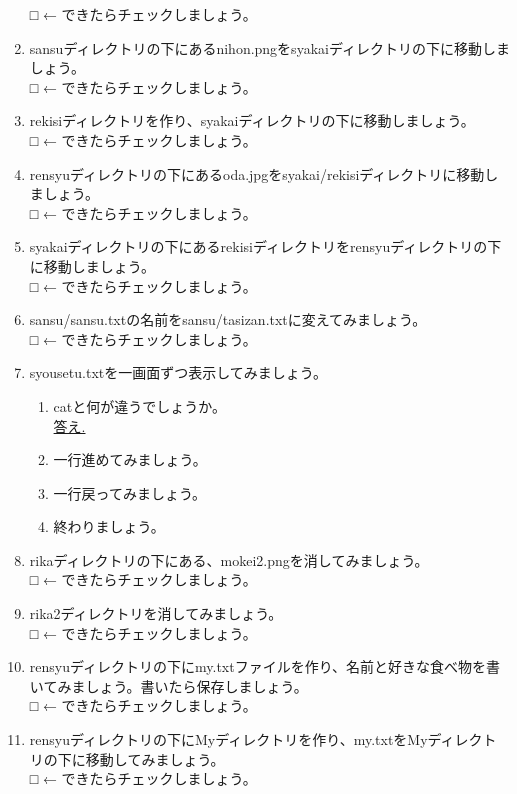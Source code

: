 \begin{tcolorbox}[title=\useOmetoi,breakable]
\begin{enumerate}
□ ← できたらチェックしましょう。
\item sansuディレクトリの下にあるnihon.pngをsyakaiディレクトリの下に移動しましょう。\\
□ ← できたらチェックしましょう。
\item rekisiディレクトリを作り、syakaiディレクトリの下に移動しましょう。\\
□ ← できたらチェックしましょう。
\item rensyuディレクトリの下にあるoda.jpgをsyakai/rekisiディレクトリに移動しましょう。\\
□ ← できたらチェックしましょう。
\item syakaiディレクトリの下にあるrekisiディレクトリをrensyuディレクトリの下に移動しましょう。\\
□ ← できたらチェックしましょう。
\item sansu/sansu.txtの名前をsansu/tasizan.txtに変えてみましょう。\\
□ ← できたらチェックしましょう。
\item syousetu.txtを一画面ずつ表示してみましょう。
	\begin{enumerate}
	\item catと何が違うでしょうか。\\
	\underline{答え.\hspace{0.8\linewidth}}
	\item 一行進めてみましょう。
	\item 一行戻ってみましょう。
	\item 終わりましょう。
	\end{enumerate}
\item rikaディレクトリの下にある、mokei2.pngを消してみましょう。\\
□ ← できたらチェックしましょう。
\item rika2ディレクトリを消してみましょう。\\
□ ← できたらチェックしましょう。
\item rensyuディレクトリの下にmy.txtファイルを作り、名前と好きな食べ物を書いてみましょう。書いたら保存しましょう。\\
□ ← できたらチェックしましょう。
\item rensyuディレクトリの下にMyディレクトリを作り、my.txtをMyディレクトリの下に移動してみましょう。\\
□ ← できたらチェックしましょう。
\end{enumerate}
\end{tcolorbox}

